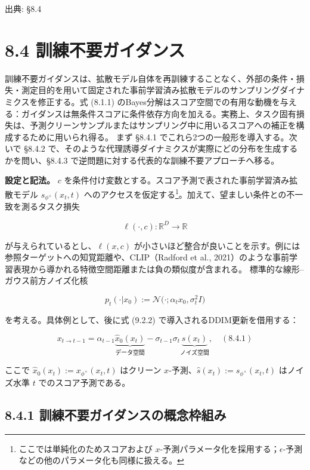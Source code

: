 

{\color{gray}\footnotesize 出典: §8.4\par}
\vspace{0.2em}

\section*{8.4 訓練不要ガイダンス}


訓練不要ガイダンスは、拡散モデル自体を再訓練することなく、外部の条件・損失・測定目的を用いて固定された事前学習済み拡散モデルのサンプリングダイナミクスを修正する。式 (8.1.1) のBayes分解はスコア空間での有用な動機を与える：ガイダンスは無条件スコアに条件依存方向を加える。実務上、タスク固有損失は、予測クリーンサンプルまたはサンプリング中に用いるスコアへの補正を構成するために用いられ得る。
まず §8.4.1 でこれら2つの一般形を導入する。次いで §8.4.2 で、そのような代理誘導ダイナミクスが実際にどの分布を生成するかを問い、§8.4.3 で逆問題に対する代表的な訓練不要アプローチへ移る。

\textbf{設定と記法。} $c$ を条件付け変数とする。スコア予測で表された事前学習済み拡散モデル $s_{\phi^\times}(x_t,t)$ へのアクセスを仮定する\footnote{ここでは単純化のためスコアおよび $x$-予測パラメータ化を採用する；$\epsilon$-予測などの他のパラメータ化も同様に扱える。}。加えて、望ましい条件との不一致を測るタスク損失

\[
\ell(\cdot,c):\mathbb{R}^D\to\mathbb{R}
\]


が与えられているとし、$\ell(x,c)$ が小さいほど整合が良いことを示す。例には参照ターゲットへの知覚距離や、CLIP（Radford et al., 2021）のような事前学習表現から導かれる特徴空間距離または負の類似度が含まれる。
標準的な線形–ガウス前方ノイズ化核

\[
p_t(\cdot|x_0):=\mathcal{N}\bigl(\cdot;\alpha_t x_0,\sigma_t^2 I\bigr)
\]


を考える。具体例として、後に式 (9.2.2) で導入されるDDIM更新を借用する：

\[
x_{t\to t-1}=\alpha_{t-1}\underbrace{\hat{x}_0(x_t)}_{\text{データ空間}}-\sigma_{t-1}\sigma_t\underbrace{\hat{s}(x_t)}_{\text{ノイズ空間}}, \quad (8.4.1)
\]


ここで $\hat{x}_0(x_t):=x_{\phi^\times}(x_t,t)$ はクリーン $x$-予測、$\hat{s}(x_t):=s_{\phi^\times}(x_t,t)$ はノイズ水準 $t$ でのスコア予測である。


\subsection*{8.4.1 訓練不要ガイダンスの概念枠組み}


